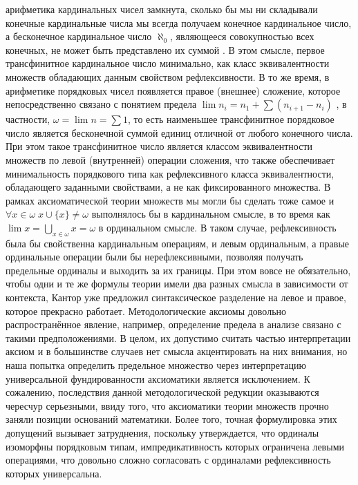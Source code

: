 \documentclass[12pt]{article}
\begin{document}
арифметика кардинальных чисел замкнута, сколько бы мы ни складывали конечные кардинальные числа мы всегда получаем конечное кардинальное число, а бесконечное кардинальное число $\aleph_0$, являющееся совокупностью всех конечных, не может быть представлено их суммой \cite{cantor-cardinal}. В этом смысле, первое трансфинитное кардинальное число минимально, как класс эквивалентности множеств обладающих данным свойством рефлексивности. В то же время, в арифметике порядковых чисел появляется правое (внешнее) сложение, которое непосредственно связано с понятием предела $\lim n_i = n_1 + \sum (n_{i + 1} - n_i)$ \cite{cantor-ordinal}, в частности, $\omega = \lim n = \sum 1$, то есть наименьшее трансфинитное порядковое число является бесконечной суммой единиц отличной от любого конечного числа. При этом такое трансфинитное число является классом эквивалентности множеств по левой (внутренней) операции сложения, что также обеспечивает минимальность порядкового типа как рефлексивного класса эквивалентности, обладающего заданными свойствами, а не как фиксированного множества. В рамках аксиоматической теории множеств мы могли бы сделать тоже самое и $\forall x \in \omega \; x \cup \{ x \} \neq \omega$ выполнялось бы в кардинальном смысле, в то время как $\lim x = \bigcup\limits_{ x \in \omega } x = \omega$ в ординальном смысле. В таком случае, рефлексивность была бы свойственна кардинальным операциям, и левым ординальным, а правые ординальные операции были бы нерефлексивными, позволяя получать предельные ординалы и выходить за их границы. При этом вовсе не обязательно, чтобы одни и те же формулы теории имели два разных смысла в зависимости от контекста, Кантор уже предложил синтаксическое разделение на левое и правое, которое прекрасно работает. Методологические аксиомы довольно распространённое явление, например, определение предела в анализе связано с такими предположениями. В целом, их допустимо считать частью интерпретации аксиом и в большинстве случаев нет смысла акцентировать на них внимания, но наша попытка определить предельное множество через интерпретацию универсальной фундированности аксиоматики является исключением. К сожалению, последствия данной методологической редукции оказываются чересчур серьезными, ввиду того, что аксиоматики теории множеств прочно заняли позиции оснований математики. Более того, точная формулировка этих допущений вызывает затруднения, поскольку утверждается, что ординалы изоморфны порядковым типам, импредикативность которых ограничена левыми операциями, что довольно сложно согласовать с ординалами рефлексивность которых универсальна.
\end{document}
